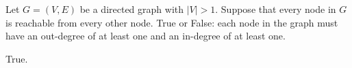 \begin{prob}
    Let $G = (V, E)$ be a directed graph with $|V| > 1$. Suppose that every
    node in $G$ is reachable from every other node. True or False: each node in
    the graph must have an out-degree of at least one and an in-degree of at
    least one.

    \begin{soln}
        True.
    \end{soln}

\end{prob}
